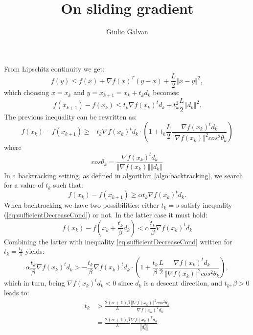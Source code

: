\documentclass{article}
\title{On sliding gradient}
\author{Giulio Galvan}
\newcommand{\norm}[1]{\left\Vert #1 \right\Vert}
\begin{document}
	\maketitle

\noindent	
From Lipschitz continuity we get:
\begin{equation}
	f(y) \leq f(x) + \nabla f(x)^T(y-x) + \frac{L}{2}\norm{x-y}^2,
\end{equation}
which choosing $x=x_k$ and $y=x_{k+1}=x_k + t_k d_k$ becomes:
\begin{equation}
	f(x_{k+1})-f(x_k) \leq t_k\nabla f(x_k)^td_k+ t_k^2\frac{L}{2}\norm{d_k}^2.
\end{equation}
The previous inequality can be rewritten as:
\begin{equation}
f(x_k)- f(x_{k+1}) \geq - t_k\nabla f(x_k)^td_k\cdot \left(1+t_k\frac{L}{2}\frac{\nabla f(x_k)^td_k}{\norm{\nabla f(x_k)}^2 cos^2\theta_k}\right)
\end{equation}
where
\begin{equation}
cos\theta_k=\frac{\nabla f(x_k)^td_k}{\norm{\nabla f(x_k)}\norm{d_k}}
\end{equation}
In a backtracking setting, as defined in algorithm \ref{algo:backtracking}, we search for a value of $t_k$ such that:
\begin{equation}
	f(x_k) - f(x_{k+1})\geq \alpha t_k \nabla f(x_k)^td_k.
	\label{eq:sufficientDecreaseCond}
\end{equation}
When backtracking we have two possibilities: either $t_k=s$ satisfy inequality (\ref{eq:sufficientDecreaseCond}) or not. In the latter case it must hold:
\begin{equation}
		f(x_k)-f(x_{k}+\frac{t_k}{\beta}d_k) < \alpha \frac{t_k}{\beta} \nabla f(x_k)^td_k
\label{eq:sufficientDecreaseViolated}
\end{equation}
Combining the latter with inequality \ref{eq:sufficientDecreaseCond} written for $t_k=\frac{t_k}{\beta}$ yields:
\begin{equation}
\alpha \frac{t_k}{\beta} \nabla f(x_k)^td_k > - \frac{t_k}{\beta}\nabla f(x_k)^td_k\cdot \left(1+\frac{t_k}{\beta}\frac{L}{2}\frac{\nabla f(x_k)^td_k}{\norm{\nabla f(x_k)}^2 cos^2\theta_k}\right),
\end{equation}
which in turn, being $\nabla f(x_k)^td_k<0$ since $d_k$ is a descent direction, and $t_k,\beta>0$ leads to:
\begin{align}
	t_k &> \frac{2(\alpha+1)\beta}{L} \frac{\norm{\nabla f(x_k)}^2 cos^2\theta_k}{\nabla f(x_k)^Td_k} 	\label{eq:lowerBound}\\
	&=\frac{2(\alpha+1)\beta}{L}\frac{\nabla f(x_k)^Td_k}{\norm{d_k^2}}
\end{align}
\end{document}
